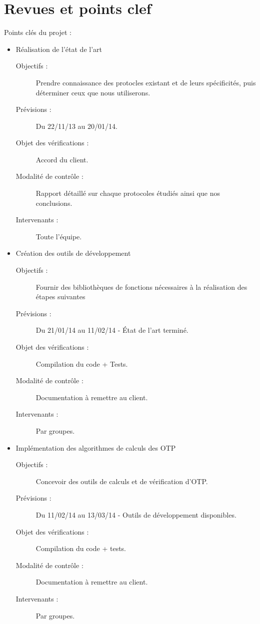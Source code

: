 \documentclass{../../res/univ-projet}
\begin{document}
	\newpage
\section{Revues et points clef}
Points clés du projet :
\begin{itemize}
	\item Réalisation de l'état de l'art
	\begin{description}
		\item[Objectifs :] Prendre connaissance des protocles existant et de leurs spécificités, puis déterminer ceux que nous utiliserons.
		\item[Prévisions :] Du 22/11/13 au 20/01/14.
		\item[Objet des vérifications :] Accord du client.
		\item[Modalité de contrôle :] Rapport détaillé sur chaque protocoles étudiés ainsi que nos conclusions.
		\item[Intervenants :] Toute l'équipe.
	\end{description}
	\item Création des outils de développement
	\begin{description}
		\item[Objectifs :] Fournir des bibliothèques de fonctions nécessaires à la réalisation des étapes suivantes
		\item[Prévisions :] Du 21/01/14 au 11/02/14 - \'Etat de l'art terminé.
		\item[Objet des vérifications :] Compilation du code + Tests.
		\item[Modalité de contrôle :] Documentation à remettre au client.
		\item[Intervenants :] Par groupes.
	\end{description}
	\item Implémentation des algorithmes de calculs des OTP
	\begin{description}
		\item[Objectifs :] Concevoir des outils de calculs et de vérification d'OTP.
		\item[Prévisions :] Du 11/02/14 au 13/03/14 - Outils de développement disponibles.
		\item[Objet des vérifications :] Compilation du code + tests.
		\item[Modalité de contrôle :] Documentation à remettre au client.
		\item[Intervenants :] Par groupes.

\end{description}
\end{itemize}
\end{document}
